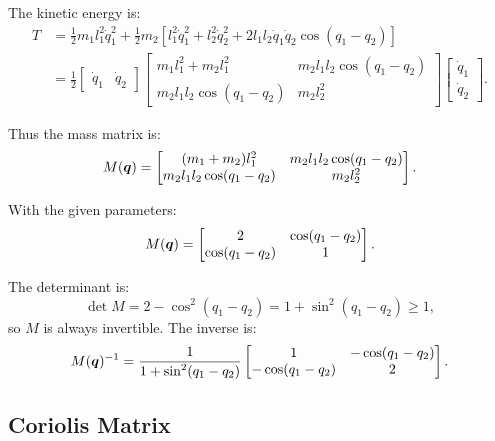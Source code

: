 The kinetic energy is:
\begin{align}
T &= \frac{1}{2}m_1 l_1^2 \dot{q}_1^2 + \frac{1}{2}m_2[l_1^2\dot{q}_1^2 + l_2^2\dot{q}_2^2 + 2l_1 l_2 \dot{q}_1\dot{q}_2\cos(q_1-q_2)]\\
&= \frac{1}{2}\begin{bmatrix}\dot{q}_1 & \dot{q}_2\end{bmatrix}\begin{bmatrix}
m_1 l_1^2 + m_2 l_1^2 & m_2 l_1 l_2 \cos(q_1-q_2)\\
m_2 l_1 l_2 \cos(q_1-q_2) & m_2 l_2^2
\end{bmatrix}\begin{bmatrix}\dot{q}_1 \\ \dot{q}_2\end{bmatrix}.
\end{align}

Thus the mass matrix is:
\begin{equation}
M(\bm{q}) = \begin{bmatrix}
(m_1 + m_2)l_1^2 & m_2 l_1 l_2 \cos(q_1-q_2)\\
m_2 l_1 l_2 \cos(q_1-q_2) & m_2 l_2^2
\end{bmatrix}.
\label{eq:ch7:mass-matrix}
\end{equation}

With the given parameters:
\begin{equation}
M(\bm{q}) = \begin{bmatrix}
2 & \cos(q_1-q_2)\\
\cos(q_1-q_2) & 1
\end{bmatrix}.
\label{eq:ch7:mass-matrix-numeric}
\end{equation}

The determinant is:
\begin{equation}
\det M = 2 - \cos^2(q_1-q_2) = 1 + \sin^2(q_1-q_2) \geq 1,
\end{equation}
so $M$ is always invertible. The inverse is:
\begin{equation}
M(\bm{q})^{-1} = \frac{1}{1+\sin^2(q_1-q_2)}\begin{bmatrix}
1 & -\cos(q_1-q_2)\\
-\cos(q_1-q_2) & 2
\end{bmatrix}.
\label{eq:ch7:mass-matrix-inverse}
\end{equation}

\subsection{Coriolis Matrix}

